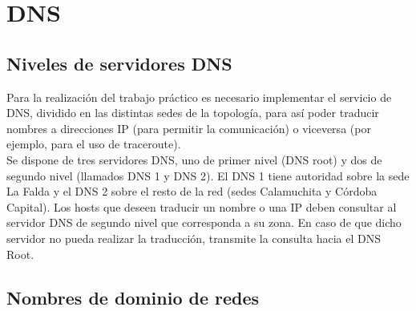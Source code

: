 \section{DNS}

\subsection{Niveles de servidores DNS}

Para la realización del trabajo práctico es necesario implementar el servicio de DNS, dividido en las distintas sedes de la topología, para así poder traducir nombres a direcciones IP (para permitir la comunicación) o viceversa (por ejemplo, para el uso de traceroute). \\ 

Se dispone de tres servidores DNS, uno de primer nivel (DNS root) y dos de segundo nivel (llamados DNS 1 y DNS 2). El DNS 1 tiene autoridad sobre la sede La Falda y el DNS 2 sobre el resto de la red (sedes Calamuchita y Córdoba Capital). Los hosts que deseen traducir un nombre o una IP deben consultar al servidor DNS de segundo nivel que corresponda a su zona. En caso de que dicho servidor no pueda realizar la traducción, transmite la consulta hacia el DNS Root. \\

\subsection{Nombres de dominio de redes}

